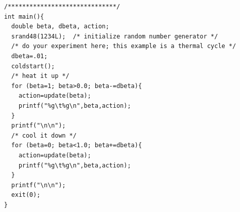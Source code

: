 \begin{lstlisting}
/******************************/
int main(){
  double beta, dbeta, action;
  srand48(1234L);  /* initialize random number generator */
  /* do your experiment here; this example is a thermal cycle */
  dbeta=.01;
  coldstart();
  /* heat it up */
  for (beta=1; beta>0.0; beta-=dbeta){
    action=update(beta);
    printf("%g\t%g\n",beta,action); 
  }
  printf("\n\n");
  /* cool it down */
  for (beta=0; beta<1.0; beta+=dbeta){
    action=update(beta);
    printf("%g\t%g\n",beta,action); 
  }
  printf("\n\n");
  exit(0);
}

\end{lstlisting}
